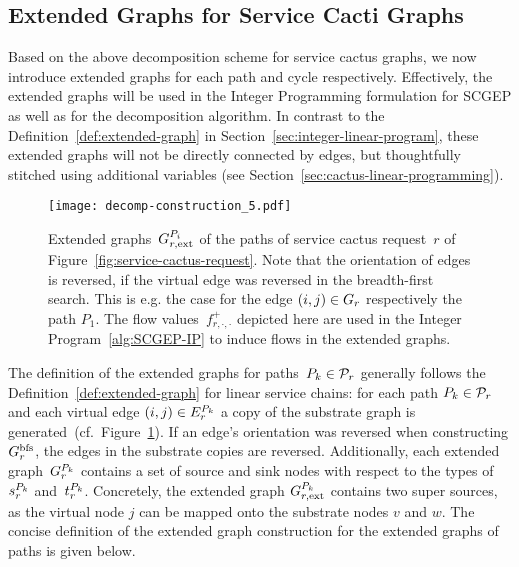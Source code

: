 \documentclass[10pt, conference, letterpaper]{IEEEtran}
\begin{document}
\subsection{Extended Graphs for Service Cacti Graphs}
\label{sec:cactus:extended-graphs}

Based on the above decomposition scheme for service cactus graphs, we now introduce extended graphs for each path and cycle respectively. Effectively, the extended graphs will be used in the Integer Programming formulation for SCGEP as well as for the decomposition algorithm. In contrast to the Definition~\ref{def:extended-graph} in Section~\ref{sec:integer-linear-program}, these extended graphs will not be directly connected by edges, but thoughtfully stitched using additional variables (see Section~\ref{sec:cactus-linear-programming}).

\begin{figure}[t!]
\centering
\texttt{[image: decomp-construction\_5.pdf]}
\caption{Extended graphs~$\VGextpath[\req][i]$ of the paths of service cactus request~$r$ of Figure~\ref{fig:service-cactus-request}. Note that the orientation of edges is reversed, if the virtual edge was reversed in the breadth-first search. This is e.g. the case for the edge $(i,j) \in  G_{r}$ respectively the path $P_1$.
The flow values~$f^+_{r,\cdot,\cdot}$ depicted here are used in the Integer Program~\ref{alg:SCGEP-IP} to induce flows in the extended graphs.}
\label{fig:service-cactus-construction-path}
\end{figure}

The definition of the extended graphs for paths~$P_k \in \Paths$ generally follows the Definition~\ref{def:extended-graph} for linear service chains: for each path $P_k \in \Paths$ and each virtual edge $(i,j) \in  \VEpath$ a copy of the substrate graph is generated~(cf.~Figure~\ref{fig:service-cactus-construction-path}). If an edge's orientation was reversed when constructing $G^{\textnormal{bfs}}_{r}$, the edges in the substrate copies are reversed. Additionally, each extended graph~$\VGpath$ contains a set of source and sink nodes with respect to the types of~$\VVpathSource$ and~$\VVpathTarget$. Concretely, the extended graph $\VGextpath$ contains two super sources, as the virtual node $j$ can be mapped onto the substrate nodes $v$ and $w$. The concise definition of the extended graph construction for the extended graphs of paths  is given below.

\pagebreak
\end{document}
